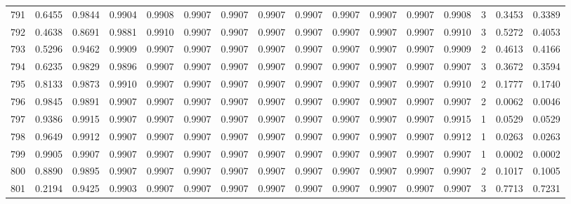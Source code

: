 \begin{tabular}{lrrrrrrrrrrrrrrr}
791 &      0.6455 &  0.9844 &  0.9904 &  0.9908 &  0.9907 &  0.9907 &  0.9907 &  0.9907 &  0.9907 &  0.9907 &   0.9907 &     0.9908 &      3 &                    0.3453 &                     0.3389 \\
792 &      0.4638 &  0.8691 &  0.9881 &  0.9910 &  0.9907 &  0.9907 &  0.9907 &  0.9907 &  0.9907 &  0.9907 &   0.9907 &     0.9910 &      3 &                    0.5272 &                     0.4053 \\
793 &      0.5296 &  0.9462 &  0.9909 &  0.9907 &  0.9907 &  0.9907 &  0.9907 &  0.9907 &  0.9907 &  0.9907 &   0.9907 &     0.9909 &      2 &                    0.4613 &                     0.4166 \\
794 &      0.6235 &  0.9829 &  0.9896 &  0.9907 &  0.9907 &  0.9907 &  0.9907 &  0.9907 &  0.9907 &  0.9907 &   0.9907 &     0.9907 &      3 &                    0.3672 &                     0.3594 \\
795 &      0.8133 &  0.9873 &  0.9910 &  0.9907 &  0.9907 &  0.9907 &  0.9907 &  0.9907 &  0.9907 &  0.9907 &   0.9907 &     0.9910 &      2 &                    0.1777 &                     0.1740 \\
796 &      0.9845 &  0.9891 &  0.9907 &  0.9907 &  0.9907 &  0.9907 &  0.9907 &  0.9907 &  0.9907 &  0.9907 &   0.9907 &     0.9907 &      2 &                    0.0062 &                     0.0046 \\
797 &      0.9386 &  0.9915 &  0.9907 &  0.9907 &  0.9907 &  0.9907 &  0.9907 &  0.9907 &  0.9907 &  0.9907 &   0.9907 &     0.9915 &      1 &                    0.0529 &                     0.0529 \\
798 &      0.9649 &  0.9912 &  0.9907 &  0.9907 &  0.9907 &  0.9907 &  0.9907 &  0.9907 &  0.9907 &  0.9907 &   0.9907 &     0.9912 &      1 &                    0.0263 &                     0.0263 \\
799 &      0.9905 &  0.9907 &  0.9907 &  0.9907 &  0.9907 &  0.9907 &  0.9907 &  0.9907 &  0.9907 &  0.9907 &   0.9907 &     0.9907 &      1 &                    0.0002 &                     0.0002 \\
800 &      0.8890 &  0.9895 &  0.9907 &  0.9907 &  0.9907 &  0.9907 &  0.9907 &  0.9907 &  0.9907 &  0.9907 &   0.9907 &     0.9907 &      2 &                    0.1017 &                     0.1005 \\
801 &      0.2194 &  0.9425 &  0.9903 &  0.9907 &  0.9907 &  0.9907 &  0.9907 &  0.9907 &  0.9907 &  0.9907 &   0.9907 &     0.9907 &      3 &                    0.7713 &                     0.7231 \\

\end{tabular}
